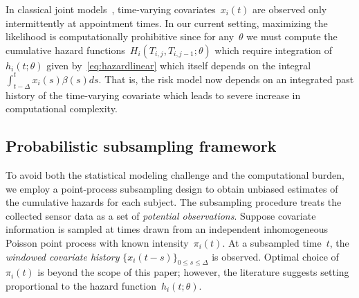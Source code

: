 \documentclass[11pt]{amsart}
\begin{document}
In classical joint models~\citep{Henderson2000, Tsiatis2004},
time-varying covariates~$x_i (t)$ are observed only intermittently at
appointment times. In our current setting, maximizing the likelihood
is computationally prohibitive since for any~$\theta$ we must compute
the cumulative hazard functions~$H_{i} (T_{i,j}, T_{i,j-1}; \theta)$
which require integration of~$h_i(t;\theta)$ given
by~\eqref{eq:hazardlinear} which itself depends on the
integral~$\int_{t-\Delta}^t x_i (s) \beta(s) ds$.  
That is, the risk model now depends on an integrated past history of
the time-varying covariate which leads to severe increase in
computational complexity. 

\subsection{Probabilistic subsampling framework}

To avoid both the statistical modeling challenge and the computational
burden, we employ a point-process subsampling design to obtain
unbiased estimates of the cumulative hazards for each subject. The
subsampling procedure treats the collected sensor data as a set of
\emph{potential observations}. 
Suppose covariate information is sampled at times drawn from an
independent inhomogeneous Poisson point process with known
intensity~$\pi_i (t)$. At a subsampled time~$t$, the \emph{windowed
  covariate history} $\{ x_i (t-s)\}_{0 \leq s \leq \Delta}$ is
observed. Optimal choice of~$\pi_i (t)$ is beyond the scope of this
paper; however, the literature suggests setting proportional to the
hazard function~$h_i (t; \theta)$.
\end{document}
